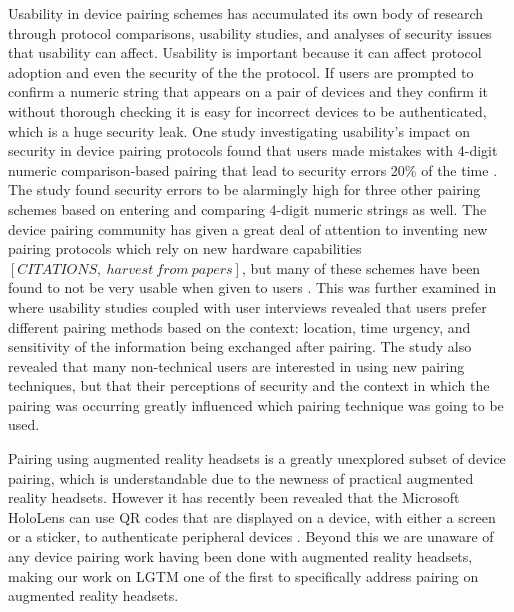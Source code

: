 \documentclass[12pt]{report}
\begin{document}
Usability in device pairing schemes has accumulated its own body of research \cite{UsabilitySecurityOutOfBandPairingKainda2009,UserPerceptionPairing,PlayfulPairingGallego2011,AliceMeetsBobKumar2009,SecurePairingUsabilityUzun2007,ConferenceCompStudySecurePairingKumar2009} through protocol comparisons, usability studies, and analyses of security issues that usability can affect. Usability is important because it can affect protocol adoption and even the security of the the protocol. If users are prompted to confirm a numeric string that appears on a pair of devices and they confirm it without thorough checking it is easy for incorrect devices to be authenticated, which is a huge security leak. One study investigating usability's impact on security in device pairing protocols found that users made mistakes with 4-digit numeric comparison-based pairing that lead to security errors 20\% of the time \cite{SecurePairingUsabilityUzun2007}. The study found security errors to be alarmingly high for three other pairing schemes based on entering and comparing 4-digit numeric strings as well. The device pairing community has given a great deal of attention to inventing new pairing protocols which rely on new hardware capabilities $[CITATIONS, \: harvest \: from \: papers]$, but many of these schemes have been found to not be very usable when given to users \cite{SecurePairingUsabilityUzun2007,ConferenceCompStudySecurePairingKumar2009}. This was further examined in \cite{UserPerceptionPairing} where usability studies coupled with user interviews revealed that users prefer different pairing methods based on the context: location, time urgency, and sensitivity of the information being exchanged after pairing. The study also revealed that many non-technical users are interested in using new pairing techniques, but that their perceptions of security and the context in which the pairing was occurring greatly influenced which pairing technique was going to be used. \par

Pairing using augmented reality headsets is a greatly unexplored subset of device pairing, which is understandable due to the newness of practical augmented reality headsets. However it has recently been revealed that the Microsoft HoloLens can use QR codes that are displayed on a device, with either a screen or a sticker, to authenticate peripheral devices \cite{HoloLensVisualPairing2016}. Beyond this we are unaware of any device pairing work having been done with augmented reality headsets, making our work on LGTM one of the first to specifically address pairing on augmented reality headsets. \par
\end{document}
